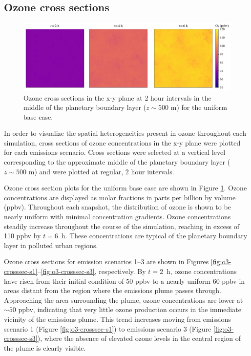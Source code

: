 
\subsection{Ozone cross sections}

\begin{figure}[h]
    \centering
    \includegraphics[width=\textwidth]{figures/chapter4/o3-crosssec-uniform-basecase-z25.pdf}
    \caption{Ozone cross sections in the x-y plane at 2 hour intervals in the middle of the planetary boundary layer ($z\sim500$ \si{m}) for the uniform base case.}
    \label{fig:o3-crosssec-ub}
  \end{figure}

In order to visualize the spatial heterogeneities present in ozone throughout each simulation, cross sections of ozone concentrations in the x-y plane were plotted for each emissions scenario. Cross sections were selected at a vertical level corresponding to the approximate middle of the planetary boundary layer ($z\sim500$ \si{m}) and were plotted at regular, 2 hour intervals. 

Ozone cross section plots for the uniform base case are shown in Figure \ref{fig:o3-crosssec-ub}. Ozone concentrations are displayed as molar fractions in parts per billion by volume (ppbv). Throughout each snapshot, the distribution of ozone is shown to be nearly uniform with minimal concentration gradients. Ozone concentrations steadily increase throughout the course of the simulation, reaching in excess of 110 ppbv by $t=6$~h. These concentrations are typical of the planetary boundary layer in polluted urban regions.

Ozone cross sections for emission scenarios 1--3 are shown in Figures \ref{fig:o3-crosssec-s1}--\ref{fig:o3-crosssec-s3}, respectively. By $t=2$~h, ozone concentrations have risen from their initial condition of 50 \si{ppbv} to a nearly uniform 60 \si{ppbv} in areas distant from the region where the emissions plume passes through. Approaching the area surrounding the plume, ozone concentrations are lower at  $\sim50$ \si{ppbv}, indicating that very little ozone production occurs in the immediate vicinity of the emissions plume. This trend increases moving from emissions scenario 1 (Figure \ref{fig:o3-crosssec-s1}) to emissions scenario 3 (Figure \ref{fig:o3-crosssec-s3}), where the absence of elevated ozone levels in the central region of the plume is clearly visible. 

